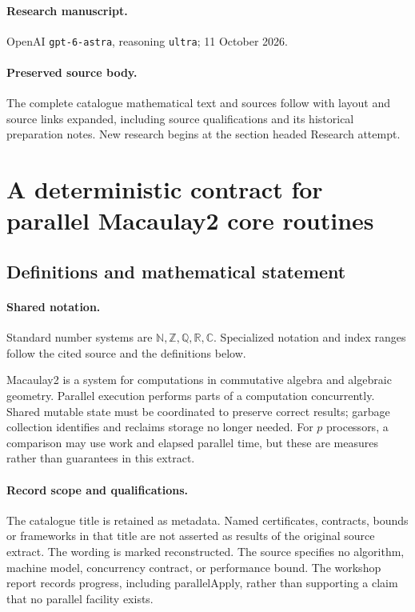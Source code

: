 \documentclass[11pt]{article}
\begin{document}
\paragraph{Research manuscript.} OpenAI \texttt{gpt-6-astra}, reasoning \texttt{ultra}; 11 October 2026.
\paragraph{Preserved source body.} The complete catalogue mathematical text and sources follow with layout and source links expanded, including source qualifications and its historical preparation notes. New research begins at the section headed Research attempt.

\section{A deterministic contract for parallel Macaulay2 core routines}\label{statement}

\subsection{Definitions and mathematical statement}

\paragraph{Shared notation.}Standard number systems are $\mathbb N,\mathbb Z,\mathbb Q,\mathbb R,\mathbb C$. Specialized notation and index ranges follow the cited source and the definitions below.


Macaulay2 is a system for computations in commutative algebra and algebraic geometry. Parallel execution performs parts of a computation concurrently. Shared mutable state must be coordinated to preserve correct results; garbage collection identifies and reclaims storage no longer needed. For $p$ processors, a comparison may use work and elapsed parallel time, but these are measures rather than guarantees in this extract.
\paragraph{Record scope and qualifications.}
The catalogue title is retained as metadata. Named certificates, contracts, bounds or frameworks in that title are not asserted as results of the original source extract.
The wording is marked reconstructed. The source specifies no algorithm, machine model, concurrency contract, or performance bound. The workshop report records progress, including parallelApply, rather than supporting a claim that no parallel facility exists.
\end{document}
